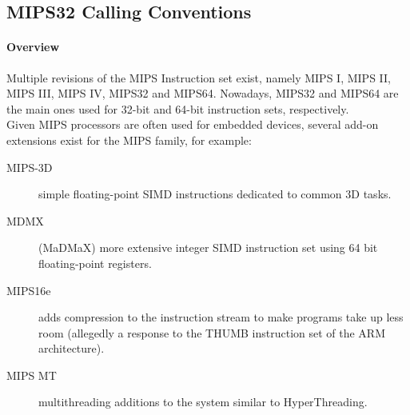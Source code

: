 %
%
%
%

\subsection{MIPS32 Calling Conventions}

\paragraph{Overview}

Multiple revisions of the MIPS Instruction set exist, namely MIPS I, MIPS II, MIPS III, MIPS IV, MIPS32 and MIPS64.
Nowadays, MIPS32 and MIPS64 are the main ones used for 32-bit and 64-bit instruction sets, respectively.\\
Given MIPS processors are often used for embedded devices, several add-on extensions exist for the MIPS family, for example: 

\begin{description}
\item [MIPS-3D] simple floating-point SIMD instructions dedicated to common 3D tasks.
\item [MDMX] (MaDMaX) more extensive integer SIMD instruction set using 64 bit floating-point registers.
\item [MIPS16e] adds compression to the instruction stream to make programs take up less room (allegedly a response to the THUMB instruction set of the ARM architecture).
\item [MIPS MT] multithreading additions to the system similar to HyperThreading.
\end{description}

